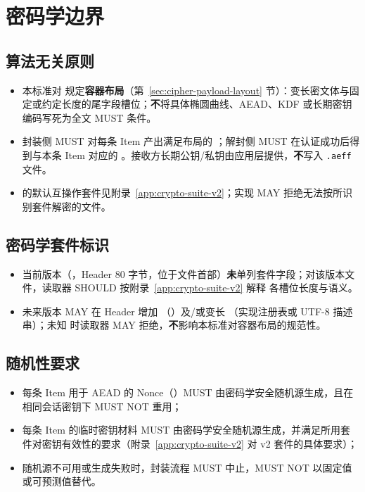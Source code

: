 
\section{密码学边界}\label{sec:crypto-chapter}

\subsection{算法无关原则}
\begin{itemize}
  \item 本标准对  规定\textbf{容器布局}（第~\ref{sec:cipher-payload-layout} 节）：变长密文体与固定或约定长度的尾字段槽位；\textbf{不}将具体椭圆曲线、AEAD、KDF 或长期密钥编码写死为全文 MUST 条件。
  \item 封装侧 MUST 对每条 Item 产出满足布局的 ；解封侧 MUST 在认证成功后得到与本条 Item 对应的 。接收方长期公钥/私钥由应用层提供，\textbf{不}写入 \texttt{.aeff} 文件。
  \item {} 的默认互操作套件见附录~\ref{app:crypto-suite-v2}；实现 MAY 拒绝无法按所识别套件解密的文件。
\end{itemize}

\subsection{密码学套件标识}\label{sec:crypto-suite-id}
\begin{itemize}
  \item 当前版本（，Header 80 字节，位于文件首部）\textbf{未}单列套件字段；对该版本文件，读取器 SHOULD 按附录~\ref{app:crypto-suite-v2} 解释  各槽位长度与语义。
  \item 未来版本 MAY 在 Header 增加 （）及/或变长 （实现注册表或 UTF-8 描述串）；未知  时读取器 MAY 拒绝，\textbf{不}影响本标准对容器布局的规范性。
\end{itemize}

\subsection{随机性要求}\label{sec:randomness}
\begin{itemize}
  \item 每条 Item 用于 AEAD 的 Nonce（）MUST 由密码学安全随机源生成，且在相同会话密钥下 MUST NOT 重用；
  \item 每条 Item 的临时密钥材料 MUST 由密码学安全随机源生成，并满足所用套件对密钥有效性的要求（附录~\ref{app:crypto-suite-v2} 对 v2 套件的具体要求）；
  \item 随机源不可用或生成失败时，封装流程 MUST 中止，MUST NOT 以固定值或可预测值替代。
\end{itemize}


